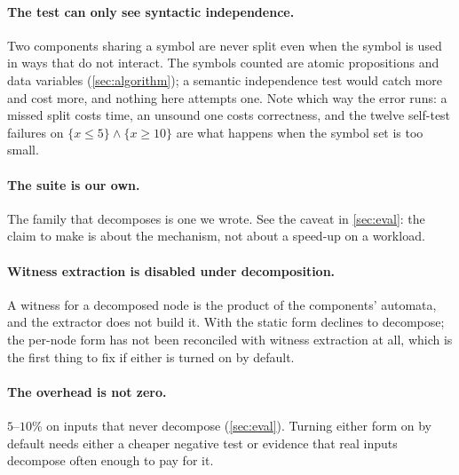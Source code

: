 \paragraph{The test can only see syntactic independence.}
Two components sharing a symbol are never split even when the symbol is used in
ways that do not interact. The symbols counted are atomic propositions and data
variables (\cref{sec:algorithm}); a semantic independence test would catch more
and cost more, and nothing here attempts one. Note which way the error runs: a
missed split costs time, an unsound one costs correctness, and the twelve
self-test failures on $\{x\le 5\}\wedge\{x\ge 10\}$ are what happens when the
symbol set is too small.

\paragraph{The suite is our own.}
The family that decomposes is one we wrote. See the caveat in
\cref{sec:eval}: the claim to make is about the mechanism, not about a speed-up
on a workload.

\paragraph{Witness extraction is disabled under decomposition.}
A witness for a decomposed node is the product of the components' automata, and
the extractor does not build it. With  the static form declines to
decompose; the per-node form has not been reconciled with witness extraction at
all, which is the first thing to fix if either is turned on by default.

\paragraph{The overhead is not zero.}
$5$--$10\%$ on inputs that never decompose (\cref{sec:eval}). Turning either
form on by default needs either a cheaper negative test or evidence that real
inputs decompose often enough to pay for it.
